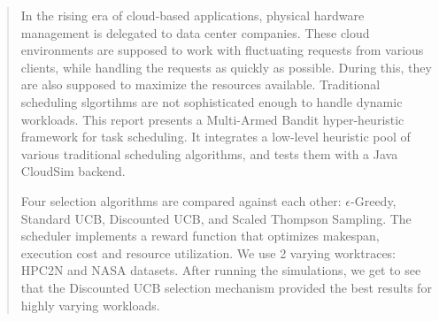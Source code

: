 

\begin{abstract}
 In the rising era of cloud-based applications, physical hardware management is delegated to data center companies. These cloud environments are supposed to work with fluctuating requests from various clients, while handling the requests as quickly as possible. During this, they are also supposed to maximize the resources available. Traditional scheduling slgortihms are not sophisticated enough to handle dynamic workloads. This report presents a Multi-Armed Bandit hyper-heuristic framework for task scheduling. It integrates a low-level heuristic pool of various traditional scheduling algorithms, and tests them with a Java CloudSim backend.

 Four selection algorithms are compared against each other: $\epsilon$-Greedy, Standard UCB, Discounted UCB, and Scaled Thompson Sampling. The scheduler implements a reward function that optimizes makespan, execution cost and resource utilization. We use 2 varying worktraces: HPC2N and NASA datasets. After running the simulations, we get to see that the Discounted UCB selection mechanism provided the best results for highly varying workloads.
\end{abstract}